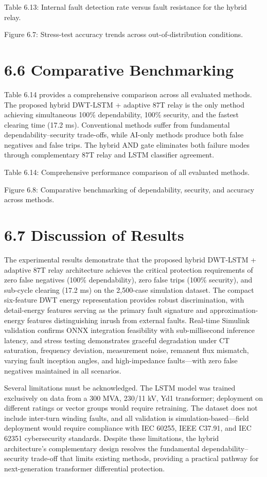 Table 6.13: Internal fault detection rate versus fault resistance for the hybrid relay.

Figure 6.7: Stress-test accuracy trends across out-of-distribution conditions.


\section{6.6  Comparative Benchmarking}
Table 6.14 provides a comprehensive comparison across all evaluated methods. The proposed hybrid DWT-LSTM + adaptive 87T relay is the only method achieving simultaneous 100\% dependability, 100\% security, and the fastest clearing time (17.2 ms). Conventional methods suffer from fundamental dependability--security trade-offs, while AI-only methods produce both false negatives and false trips. The hybrid AND gate eliminates both failure modes through complementary 87T relay and LSTM classifier agreement.

Table 6.14: Comprehensive performance comparison of all evaluated methods.

Figure 6.8: Comparative benchmarking of dependability, security, and accuracy across methods.


\section{6.7  Discussion of Results}
The experimental results demonstrate that the proposed hybrid DWT-LSTM + adaptive 87T relay architecture achieves the critical protection requirements of zero false negatives (100\% dependability), zero false trips (100\% security), and sub-cycle clearing (17.2 ms) on the 2,500-case simulation dataset. The compact six-feature DWT energy representation provides robust discrimination, with detail-energy features serving as the primary fault signature and approximation-energy features distinguishing inrush from external faults. Real-time Simulink validation confirms ONNX integration feasibility with sub-millisecond inference latency, and stress testing demonstrates graceful degradation under CT saturation, frequency deviation, measurement noise, remanent flux mismatch, varying fault inception angles, and high-impedance faults---with zero false negatives maintained in all scenarios.

Several limitations must be acknowledged. The LSTM model was trained exclusively on data from a 300 MVA, 230/11 kV, Yd1 transformer; deployment on different ratings or vector groups would require retraining. The dataset does not include inter-turn winding faults, and all validation is simulation-based---field deployment would require compliance with IEC 60255, IEEE C37.91, and IEC 62351 cybersecurity standards. Despite these limitations, the hybrid architecture's complementary design resolves the fundamental dependability--security trade-off that limits existing methods, providing a practical pathway for next-generation transformer differential protection.


